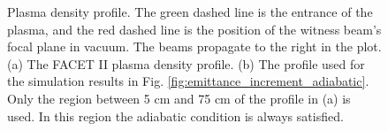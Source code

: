 \documentclass[%
reprint, superscriptaddress,
 amsmath,amssymb, aps,
prstab,
]{revtex4-2}
\begin{document}
\begin{figure} 
    \caption{Plasma density profile. The green dashed line is the entrance
 of the plasma, and the red dashed line is the position of the witness
 beam's focal plane in vacuum. The beams propagate to the right in the
 plot. (a) The FACET II plasma density profile. (b) The profile used for the simulation results in Fig. \ref{fig:emittance_increment_adiabatic}.  Only the region between 5 cm and 75 cm  of the profile in (a) is used. In this region the adiabatic condition is always satisfied.}
    \label{fig:plasma_density_profile} 
\end{figure}
\end{document}
